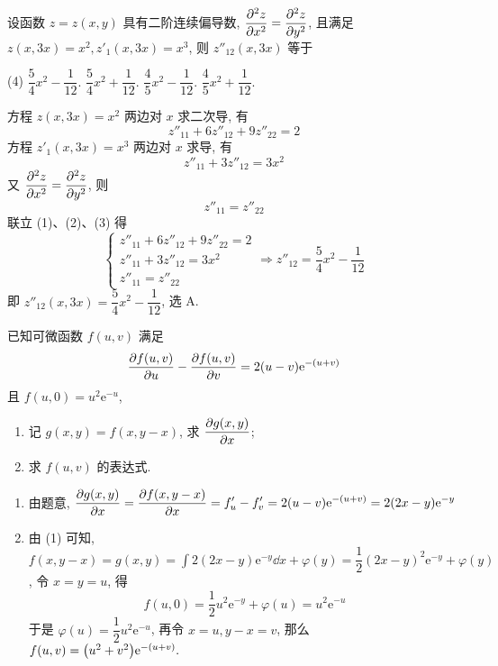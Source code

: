 \begin{example}
    设函数 $z=z(x,y)$ 具有二阶连续偏导数, $\displaystyle \pdv[2]{z}{x}=\pdv[2]{z}{y}$, 且满足 $z(x,3x)=x^2,z'_1(x,3x)=x^3$, 则 $z''_{12}(x,3x)$ 等于 
    \begin{tasks}(4)
        \task $\dfrac{5}{4}x^2-\dfrac{1}{12}.$
        \task $\dfrac{5}{4}x^2+\dfrac{1}{12}.$
        \task $\dfrac{4}{5}x^2-\dfrac{1}{12}.$
        \task $\dfrac{4}{5}x^2+\dfrac{1}{12}.$
    \end{tasks}
\end{example}
\begin{solution}
    方程 $z(x,3x)=x^2$ 两边对 $x$ 求二次导, 有 
    \begin{equation*}
        z''_{11}+6z''_{12}+9z''_{22}=2
        \tag{1}
    \end{equation*}
    方程 $z'_1(x,3x)=x^3$ 两边对 $x$ 求导, 有
    \begin{equation*}
        z''_{11}+3z''_{12}=3x^2
        \tag{2}
    \end{equation*}
    又 $\displaystyle \pdv[2]{z}{x}=\pdv[2]{z}{y}$, 则 
    \begin{equation*}
        z''_{11}=z''_{22}
        \tag{3}
    \end{equation*}
    联立 (1)、(2)、(3) 得 
    $$
    \begin{cases}
        z''_{11}+6z''_{12}+9z''_{22}=2 \\
        z''_{11}+3z''_{12}=3x^2\\ 
        z''_{11}=z''_{22}
    \end{cases}\Rightarrow z''_{12}=\dfrac{5}{4}x^2-\dfrac{1}{12}
    $$
    即 $z''_{12}(x,3x)=\dfrac{5}{4}x^2-\dfrac{1}{12}$, 选 A.
\end{solution}

\begin{example}
    已知可微函数 $f(u,v)$ 满足 $$\pdv{f(u,v)}{u}-\pdv{f(u,v)}{v}=2(u-v)\mathrm{e}^{-(u+v)}$$
    且 $f(u,0)=u^2\mathrm{e}^{-u}$,
    \begin{enumerate}[label=(\arabic{*})]
        \item 记 $g(x,y)=f(x,y-x)$, 求 $\displaystyle\pdv{g(x,y)}{x}$;
        \item 求 $f(u,v)$ 的表达式.
    \end{enumerate}
\end{example}
\begin{solution}
    \begin{enumerate}[label=(\arabic{*})]
        \item 由题意, $\displaystyle\pdv{g(x,y)}{x}=\pdv{f(x,y-x)}{x}=f'_u-f'_v=2(u-v)\mathrm{e}^{-(u+v)}=2(2x-y)\mathrm{e}^{-y}$
        \item 由 (1) 可知, $\displaystyle f(x,y-x)=g(x,y)=\int 2(2x-y)\mathrm{e}^{-y}\dd x+\varphi(y)=\dfrac{1}{2}(2x-y)^2\mathrm{e}^{-y}+\varphi(y)$, 令 $x=y=u$, 得
              $$f(u,0)=\dfrac{1}{2}u^2\mathrm{e}^{-y}+\varphi(u)=u^2\mathrm{e}^{-u}$$
              于是 $\varphi(u)=\dfrac{1}{2}u^2\mathrm{e}^{-u}$, 再令 $x=u,y-x=v$, 那么 $f(u,v)=\qty(u^2+v^2)\mathrm{e}^{-(u+v)}.$
    \end{enumerate}
\end{solution}

